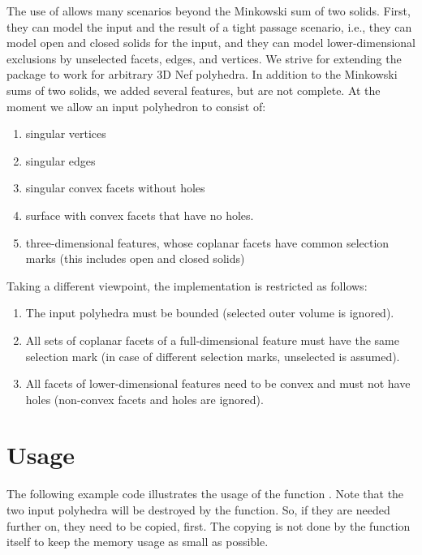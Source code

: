 The use of  allows many scenarios beyond the
Minkowski sum of two solids. First, they can model the input and the
result of a tight passage scenario, i.e., they can model open and
closed solids for the input, and they can model lower-dimensional
exclusions by unselected facets, edges, and vertices. We strive for
extending the package to work for arbitrary 3D Nef polyhedra. In
addition to the Minkowski sums of two solids, we added several
features, but are not complete. At the moment we allow an input
polyhedron to consist of:
\begin{enumerate}
\item singular vertices
\item singular edges
\item singular convex facets without holes
\item surface with convex facets that have no holes.
\item three-dimensional features, whose coplanar facets have
common selection marks (this includes open and closed solids)
\end{enumerate}

Taking a different viewpoint, the implementation is restricted as
follows:
\begin{enumerate}
\item The input polyhedra must be bounded (selected outer volume is ignored).
\item All sets of coplanar facets of a full-dimensional
feature must have the same selection mark (in case of different
selection marks, unselected is assumed).
\item All facets of lower-dimensional features need to be convex and 
must not have holes (non-convex facets and holes are ignored).
\end{enumerate}

\section{Usage}

The following example code illustrates the usage of the function
. Note that the two input polyhedra will be
destroyed by the function. So, if they are needed further on, they
need to be copied, first. The copying is not done by the function
itself to keep the memory usage as small as possible.



